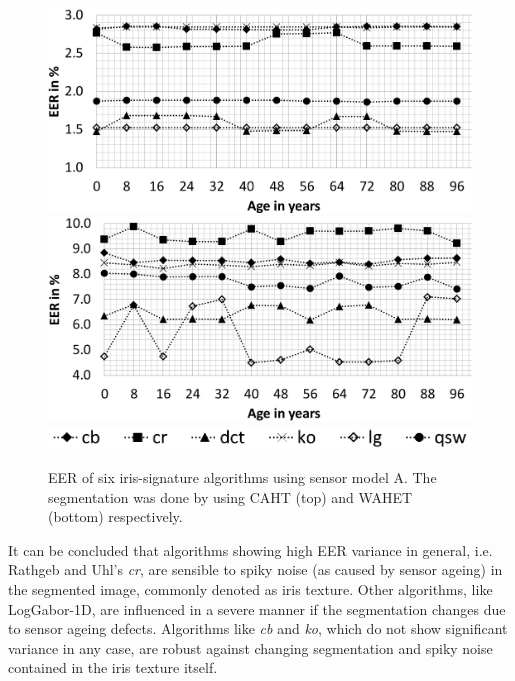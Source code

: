 \documentclass[10pt,twocolumn,letterpaper]{article}
\begin{document}
 
  \begin{figure}
  \centering
  \includegraphics[width=\linewidth]{img/sensor1_caht.png}
  \includegraphics[width=\linewidth]{img/sensor1_wahet.png}
  \includegraphics[width=0.8\linewidth]{img/legend_sensor1.png}
  \caption{EER of six iris-signature algorithms using sensor model A. The segmentation was done by using CAHT (top) and WAHET (bottom) respectively.}
  \label{fig:sensor1}
\end{figure}

It can be concluded that algorithms showing high EER variance in general, i.e. Rathgeb and Uhl's \emph{cr}, are sensible to spiky noise (as caused by sensor ageing) in the segmented image, commonly denoted as iris texture. Other algorithms, like LogGabor-1D, are influenced in a severe manner if the segmentation changes due to sensor ageing defects. Algorithms like \emph{cb} and \emph{ko}, which do not show significant variance in any case, are robust against changing segmentation and spiky noise contained in the iris texture itself.
\end{document}
